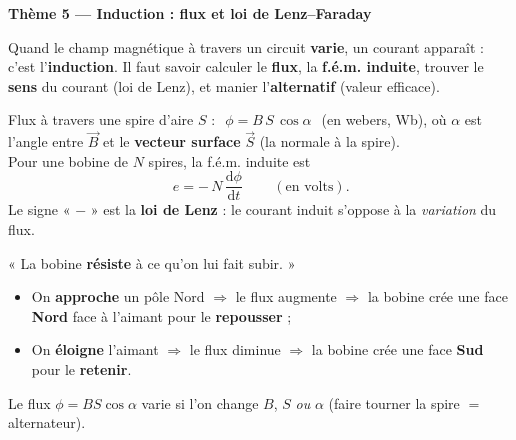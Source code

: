 \documentclass[11pt,a4paper]{article}
\newcommand{\vv}[1]{\vec{#1}}\newcommand{\ds}{\displaystyle}
\begin{document}
\begin{center}
{\Large\bfseries\color{primarydark} Thème 5 — Induction : flux et loi de Lenz--Faraday}
\end{center}

\noindent Quand le champ magnétique à travers un circuit \textbf{varie}, un courant apparaît : c'est
l'\textbf{induction}. Il faut savoir calculer le \textbf{flux}, la \textbf{f.é.m. induite}, trouver le
\textbf{sens} du courant (loi de Lenz), et manier l'\textbf{alternatif} (valeur efficace).

\begin{cle}
Flux à travers une spire d'aire $S$ : $\ \boxed{\,\phi=B\,S\,\cos\alpha\,}\ $ (en webers, \si{\weber}),
où $\alpha$ est l'angle entre $\vv{B}$ et le \textbf{vecteur surface} $\vv{S}$ (la normale à la spire).\\[2pt]
Pour une bobine de $N$ spires, la f.é.m. induite est
\[ \boxed{\,e=-\,N\,\dfrac{\mathrm{d}\phi}{\mathrm{d} t}\,}\qquad(\text{en volts}). \]
Le signe « $-$ » est la \textbf{loi de Lenz} : le courant induit s'oppose à la \emph{variation} du flux.
\end{cle}

\begin{center}
\end{center}

\begin{methode}
« La bobine \textbf{résiste} à ce qu'on lui fait subir. »
\begin{itemize}[leftmargin=1.5em,topsep=1pt,itemsep=0pt]
  \item On \textbf{approche} un pôle Nord $\Rightarrow$ le flux augmente $\Rightarrow$ la bobine crée une
        face \textbf{Nord} face à l'aimant pour le \textbf{repousser} ;
  \item On \textbf{éloigne} l'aimant $\Rightarrow$ le flux diminue $\Rightarrow$ la bobine crée une face
        \textbf{Sud} pour le \textbf{retenir}.
\end{itemize}
Le flux $\phi=BS\cos\alpha$ varie si l'on change $B$, $S$ \emph{ou} $\alpha$ (faire tourner la spire
$=$ alternateur).
\end{methode}
\end{document}
